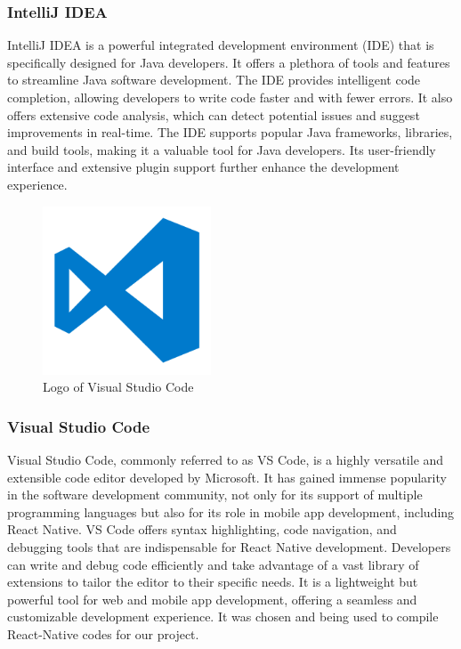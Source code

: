 \documentclass[conference]{IEEEtran}
\begin{document}
        \subsubsection{IntelliJ IDEA}
        IntelliJ IDEA is a powerful integrated development environment (IDE) that is specifically designed for Java developers. It offers a plethora of tools and features to streamline Java software development. The IDE provides intelligent code completion, allowing developers to write code faster and with fewer errors. It also offers extensive code analysis, which can detect potential issues and suggest improvements in real-time. The IDE supports popular Java frameworks, libraries, and build tools, making it a valuable tool for Java developers. Its user-friendly interface and extensive plugin support further enhance the development experience.\\
    
        \begin{figure}[htbp]
        \centerline{\includegraphics[width=5cm]{Images/logo/vsc.png}}
        \label{fig}
        \caption{Logo of Visual Studio Code}
        \end{figure}
        \subsubsection{Visual Studio Code}
        Visual Studio Code, commonly referred to as VS Code, is a highly versatile and extensible code editor developed by Microsoft. It has gained immense popularity in the software development community, not only for its support of multiple programming languages but also for its role in mobile app development, including React Native. VS Code offers syntax highlighting, code navigation, and debugging tools that are indispensable for React Native development. Developers can write and debug code efficiently and take advantage of a vast library of extensions to tailor the editor to their specific needs. It is a lightweight but powerful tool for web and mobile app development, offering a seamless and customizable development experience. It was chosen and being used to compile React-Native codes for our project.\\
    
\end{document}
